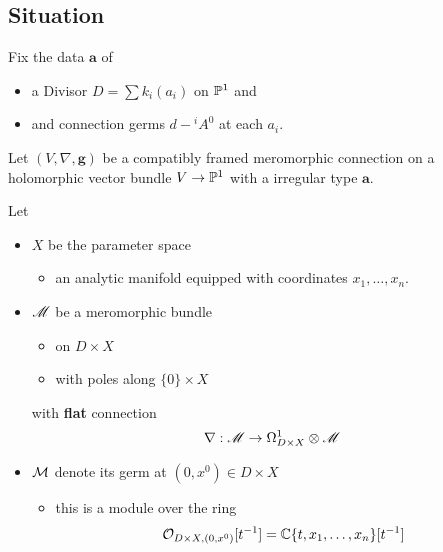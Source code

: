 \subsection{Situation} %
\begin{paracol}{2} %
  Fix the data $\textbf{a}$ of
  \begin{itemize}
    \item a Divisor $D=\sum k_i(a_i)$ on $\P^1$ and
    \item and connection germs $d-{}^iA^0$ at each $a_i$.
  \end{itemize}
  Let $(V,\nabla,\textbf{g})$ be a compatibly framed meromorphic connection on
  a holomorphic vector bundle $V\to\P^1$ with a irregular type $\textbf{a}$.

  \switchcolumn{} %
  Let
  \begin{itemize}
    \item $X$ be the parameter space
      \begin{itemize}
        \item an analytic manifold equipped with coordinates $x_1,\ldots,x_n$.
      \end{itemize}
    \item $\sM$ be a meromorphic bundle
      \begin{itemize}
        \item on $D\times X$
        \item with poles along $\{0\}\times X$
      \end{itemize}
      with \textbf{flat} connection
      \[
        \nabla:\sM\to\Omega_{D\times X}^1\otimes\sM
      \]
    \item $\cM$ denote its germ at $(0,x^0)\in D\times X$
      \begin{itemize}
        \item this is a module over the ring
          \[
            \cO_{D\times X,(0,x^0)}[t^{-1}]=\C\{t,x_1,\dots,x_n\}[t^{-1}]
          \]
      \end{itemize}
  \end{itemize}
\end{paracol} %

